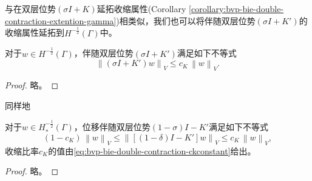 与在双层位势$\left( \sigma I + K \right)$延拓收缩属性(Corollary \ref{corollary:bvp-bie-double-contraction-extention-gamma})相类似，我们也可以将伴随双层位势$\left( \sigma I + K' \right)$的收缩属性延拓到$H^{-\frac{1}{2}}(\Gamma)$中。
\begin{corollary}[伴随双层位势收缩比率]
  \label{corollary:bvp-bie-adjoint-double-contraction-extention-gamma}
  对于$w \in H^{-\frac{1}{2}}(\Gamma)$，伴随双层位势$\left( \sigma I + K' \right)$满足如下不等式
  \begin{equation}
  \label{eq:bvp-bie-adjoint-double-contraction-extention-gamma}
  \left\|
  \left( \sigma I + K' \right) w
  \right\|_{V}
  \le c_{K} \, \left\| w \right\|_{V}.
  \end{equation}
\end{corollary}
\begin{proof}
  略。
\end{proof}

同样地
\begin{corollary}[位移伴随双层位势收缩比率]
  \label{corollary:bvp-bie-shifted-adjoint-double-contraction-extention-gamma}
  对于$w \in H_{*}^{-\frac{1}{2}}(\Gamma)$，位移伴随双层位势$\left(1-\sigma \right)I - K'$满足如下不等式
  \begin{equation}
    \label{eq:bvp-bie-shifted-adjoint-double-contraction-extention-gamma}
    \left( 1 - c_{K} \right) \,
    \left\| w \right\|_{V}
    \le \left\|
    \left[
    \left( 1 - \delta \right) I - K'
    \right] w
    \right\|_{V}
    \le c_{K} \, \left\| w \right\|_{V},
  \end{equation}
  收缩比率$c_{K}$的值由\eqref{eq:bvp-bie-double-contraction-ckconstant}给出。
\end{corollary}
\begin{proof}
  略。
\end{proof}
